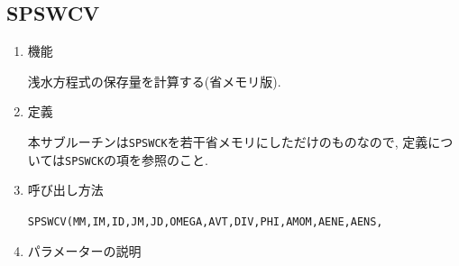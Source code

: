 \documentclass[a4j,fleqn]{jarticle}
\begin{document}

\subsection{SPSWCV}

\begin{enumerate}

\item 機能

浅水方程式の保存量を計算する(省メモリ版).

\item 定義

本サブルーチンは{\tt SPSWCK}を若干省メモリにしただけのものなので,
定義については{\tt SPSWCK}の項を参照のこと.

\item 呼び出し方法 

{\tt SPSWCV(MM,IM,ID,JM,JD,OMEGA,AVT,DIV,PHI,AMOM,AENE,AENS,}\\
\hspace*{10em}{\tt RN,IT,T,Y,IP,P,R,IA,A,Q,WS,WW)}
  
\item パラメーターの説明


\end{enumerate}
\end{document}
